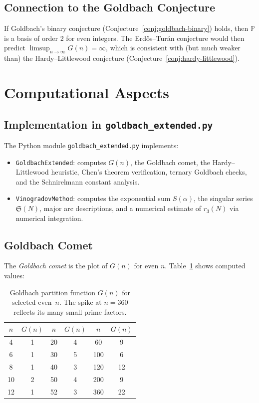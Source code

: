 \documentclass[12pt,a4paper]{amsart}
\theoremstyle{definition}
\begin{document}
\subsection{Connection to the Goldbach Conjecture}

If Goldbach's binary conjecture (Conjecture~\ref{conj:goldbach-binary})
holds, then $\mathbb{P}$ is a basis of order 2 for even integers.
The Erd\H{o}s--Tur\'{a}n conjecture would then predict
$\limsup_{n \to \infty} G(n) = \infty$, which is consistent with
(but much weaker than) the Hardy--Littlewood conjecture
(Conjecture~\ref{conj:hardy-littlewood}).

\section{Computational Aspects}\label{sec:computational}

\subsection{Implementation in \texttt{goldbach\_extended.py}}

The Python module \texttt{goldbach\_extended.py} implements:
\begin{itemize}
\item \texttt{GoldbachExtended}: computes $G(n)$, the Goldbach comet,
      the Hardy--Littlewood heuristic, Chen's theorem verification,
      ternary Goldbach checks, and the Schnirelmann constant analysis.
\item \texttt{VinogradovMethod}: computes the exponential sum $S(\alpha)$,
      the singular series $\mathfrak{S}(N)$, major arc descriptions, and
      a numerical estimate of $r_3(N)$ via numerical integration.
\end{itemize}

\subsection{Goldbach Comet}

The \emph{Goldbach comet} is the plot of $G(n)$ for even $n$.
Table~\ref{tab:comet} shows computed values:

\begin{table}[h]
\centering
\begin{tabular}{@{}cc|cc|cc@{}}
\toprule
$n$ & $G(n)$ & $n$ & $G(n)$ & $n$ & $G(n)$ \\
\midrule
4   & 1  & 20  & 4  & 60  & 9  \\
6   & 1  & 30  & 5  & 100 & 6  \\
8   & 1  & 40  & 3  & 120 & 12 \\
10  & 2  & 50  & 4  & 200 & 9  \\
12  & 1  & 52  & 3  & 360 & 22 \\
\bottomrule
\end{tabular}
\caption{Goldbach partition function $G(n)$ for selected even~$n$.
The spike at $n = 360$ reflects its many small prime factors.}
\label{tab:comet}
\end{table}
\end{document}
